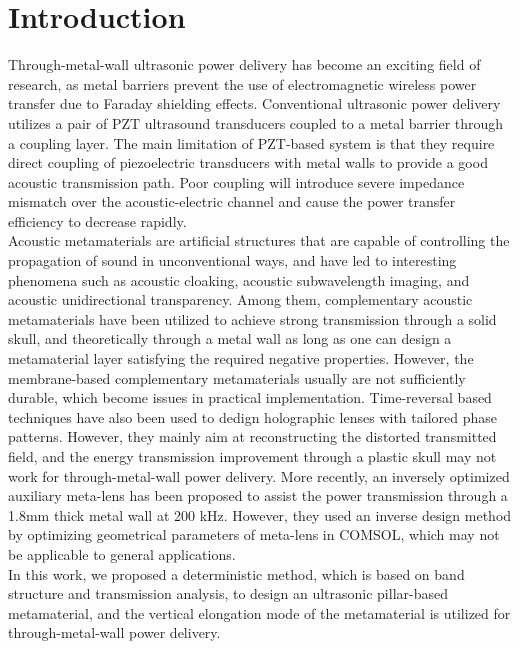 \documentclass{WileyMSP-template}
\begin{document}

\justifying
\section{Introduction}

Through-metal-wall ultrasonic power delivery has become an exciting field of research, as metal barriers prevent the use of electromagnetic wireless power transfer due to Faraday shielding effects\cite{yang2015through}. Conventional ultrasonic power delivery utilizes a pair of PZT ultrasound transducers coupled to a metal barrier through a coupling layer. The main limitation of PZT-based system is that they require direct coupling of piezoelectric transducers with metal walls to provide a good acoustic transmission path. Poor coupling will introduce severe impedance mismatch over the acoustic-electric channel and cause the power transfer efficiency to decrease rapidly. 
\\Acoustic metamaterials \cite{cummer2016controlling} are artificial structures that are capable of controlling the propagation of sound in unconventional ways, and have led to interesting phenomena such as acoustic cloaking, acoustic subwavelength imaging, and acoustic unidirectional transparency. Among them, complementary acoustic metamaterials have been utilized to achieve strong transmission through a solid skull, and theoretically through a metal wall as long as one can design a metamaterial layer satisfying the required negative properties. However, the membrane-based complementary metamaterials usually are not sufficiently durable, which become issues in practical implementation. Time-reversal based techniques have also been used to dedign holographic lenses with tailored phase patterns. However, they mainly aim at reconstructing the distorted transmitted field, and the energy transmission improvement through a plastic skull may not work for through-metal-wall power delivery. More recently, an inversely optimized auxiliary meta-lens has been proposed to assist the power transmission through a 1.8mm thick metal wall at 200 kHz. However, they used an inverse design method by optimizing geometrical parameters of meta-lens in COMSOL, which may not be applicable to general applications. 
\\In this work, we proposed a deterministic method, which is based on band structure and transmission analysis, to design an ultrasonic pillar-based metamaterial, and the vertical elongation mode of the metamaterial is utilized for through-metal-wall power delivery. 
\end{document}
